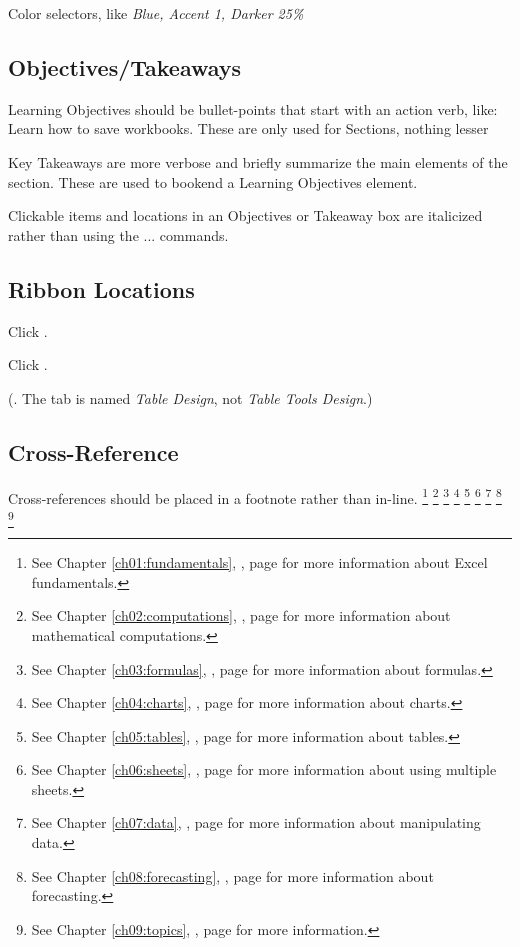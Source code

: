 \begin{enumerate}[resume]
  Color selectors, like \textit{Blue, Accent 1, Darker 25\%}

\subsection{Objectives/Takeaways}

Learning Objectives should be bullet-points that start with an action verb, like: Learn how to save workbooks. These are only used for Sections, nothing lesser

Key Takeaways are more verbose and briefly summarize the main elements of the section. These are used to bookend a Learning Objectives element.

Clickable items and locations in an Objectives or Takeaway box are italicized rather than using the \fmt... commands.

\subsection{Ribbon Locations}
Click .

Click .

(. The tab is named \textit{Table Design}, not \textit{Table Tools Design}.)

\subsection{Cross-Reference}
Cross-references should be placed in a footnote rather than in-line.
\footnote{See Chapter \ref{ch01:fundamentals}, , page \pageref{ch01:fundamentals} for more information about Excel fundamentals.}
\footnote{See Chapter \ref{ch02:computations}, , page \pageref{ch02:computations} for more information about mathematical computations.}
\footnote{See Chapter \ref{ch03:formulas}, , page \pageref{ch03:formulas} for more information about formulas.}
\footnote{See Chapter \ref{ch04:charts}, , page \pageref{ch04:charts} for more information about charts.}
\footnote{See Chapter \ref{ch05:tables}, , page \pageref{ch05:tables} for more information about tables.}
\footnote{See Chapter \ref{ch06:sheets}, , page \pageref{ch06:sheets} for more information about using multiple sheets.}
\footnote{See Chapter \ref{ch07:data}, , page \pageref{ch07:data} for more information about manipulating data.}
\footnote{See Chapter \ref{ch08:forecasting}, , page \pageref{ch08:forecasting} for more information about forecasting.}
\footnote{See Chapter \ref{ch09:topics}, , page \pageref{ch09:topics} for more information.}


\end{enumerate}
